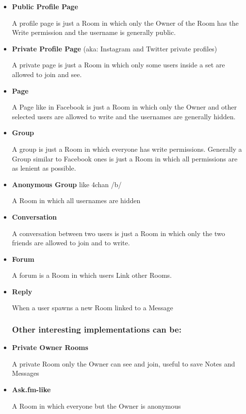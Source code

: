 \documentclass[12pt]{article}
\begin{document}
\begin{itemize}
    \item \textbf{Public Profile Page}
    
    A profile page is just a Room in which only the Owner of the Room has the Write permission and the username is generally public.

    \item \textbf{Private Profile Page} (aka: Instagram and Twitter private profiles)
    
    A private page is just a Room in which only some users inside a set are allowed to join and see.

    \item \textbf{Page}

    A Page like in Facebook is just a Room in which only the Owner and other selected users are allowed to write and the usernames are generally hidden.

    \item \textbf{Group}

    A group is just a Room in which everyone has write permissions.
    Generally a Group similar to Facebook ones is just a Room in which all permissions are as lenient as possible.

    \item \textbf{Anonymous Group} like 4chan /b/

    A Room in which all usernames are hidden

    \item \textbf{Conversation}

    A conversation between two users is just a Room in which only the two friends are allowed to join and to write.

    \item \textbf{Forum}

    A forum is a Room in which users Link other Rooms.

    \item \textbf{Reply}

    When a user spawns a new Room linked to a Message

    \subsubsection*{Other interesting implementations can be:}

    \item \textbf{Private Owner Rooms}
    
    A private Room only the Owner can see and join, useful to save Notes and Messages

    \item \textbf{Ask.fm-like}
    
    A Room in which everyone but the Owner is anonymous

    
    
    

\end{itemize}
\end{document}
